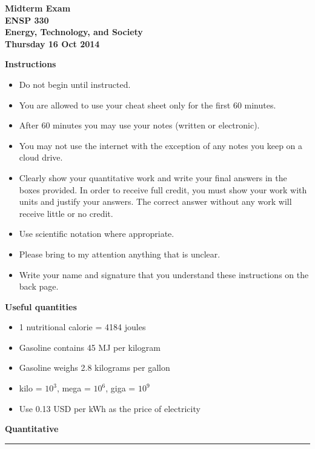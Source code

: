 \documentclass[12pt, oneside]{article}
\newcommand{\chead}[1]
{\begin{center}\large\textbf{#1}\end{center}
\hrule
\vspace{10pt}}
\begin{document}
\begin{center}
{\bf Midterm Exam}\\
{\bf ENSP 330}\\
{\bf Energy, Technology, and Society}\\
{\bf Thursday 16 Oct 2014}\\
\end{center}


\noindent
{\bf Instructions}
\begin{itemize}
\item Do not begin until instructed.
\item You are allowed to use your cheat sheet only for the first 60
minutes.
\item After 60 minutes you may use your notes (written or electronic).
\item You may not use the internet with the exception of any notes you
keep on a cloud drive.
\item Clearly show your quantitative work and write your final answers
in the boxes provided.  In order to receive full credit, you must show
your work with units and justify your answers.  The correct answer
without any work will receive little or no credit.
\item Use scientific notation where appropriate.
\item Please bring to my attention anything that is unclear.
\item Write your name and signature that you understand these
instructions on the back page.
\end{itemize}

\noindent
{\bf Useful quantities}
\begin{itemize}
\item 1 nutritional calorie = 4184 joules
\item Gasoline contains 45 MJ per kilogram
\item Gasoline weighs 2.8 kilograms per gallon
\item kilo = $10^3$, mega = $10^6$, giga = $10^9$
\item Use 0.13 USD per kWh as the price of electricity
\end{itemize}

\vfill


%
%

\newpage
\chead{Quantitative}

%
\end{document}
